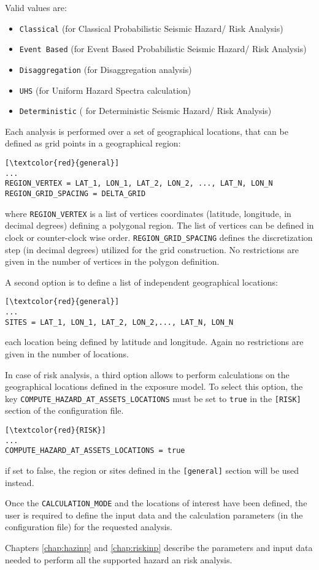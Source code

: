 Valid values are: 
\begin{itemize}
\item \Verb+Classical+ (for Classical Probabilistic Seismic Hazard/ Risk Analysis)
\item \Verb+Event Based+ (for Event Based Probabilistic Seismic Hazard/ Risk Analysis)
\item \Verb+Disaggregation+ (for Disaggregation analysis)
\item \Verb+UHS+ (for Uniform Hazard Spectra calculation)
\item \Verb+Deterministic+ ( for Deterministic Seismic Hazard/ Risk Analysis)
\end{itemize}

Each analysis is performed over a set of geographical locations, that can be defined as grid points in a geographical region:

\begin{Verbatim}[frame=single, commandchars=\\\{\}, samepage=true]
[\textcolor{red}{general}]
...
REGION_VERTEX = LAT_1, LON_1, LAT_2, LON_2, ..., LAT_N, LON_N
REGION_GRID_SPACING = DELTA_GRID
\end{Verbatim}

where \Verb+REGION_VERTEX+ is a list of vertices coordinates (latitude, longitude, in decimal degrees) defining a polygonal region. The list of vertices can be defined in clock or counter-clock wise order. \Verb+REGION_GRID_SPACING+ defines the discretization step (in decimal degrees) utilized for the grid construction. No restrictions are given in the number of vertices in the polygon definition.

A second option is to define a list of independent geographical locations:
\begin{Verbatim}[frame=single, commandchars=\\\{\}, samepage=true]
[\textcolor{red}{general}]
...
SITES = LAT_1, LON_1, LAT_2, LON_2,..., LAT_N, LON_N
\end{Verbatim}
each location being defined by latitude and longitude. Again no restrictions are given in the number of locations.

In case of risk analysis, a third option allows to perform calculations on the geographical locations defined in the exposure model. To select this option, the key \Verb+COMPUTE_HAZARD_AT_ASSETS_LOCATIONS+ must be set to \Verb+true+ in the \Verb+[RISK]+ section of the configuration file.
\begin{Verbatim}[frame=single, commandchars=\\\{\}, samepage=true]
[\textcolor{red}{RISK}]
...
COMPUTE_HAZARD_AT_ASSETS_LOCATIONS = true
\end{Verbatim}
if set to false, the region or sites defined in the \Verb+[general]+ section will be used instead.

Once the \Verb+CALCULATION_MODE+ and the locations of interest have been defined, the user is required to define the input data and the calculation parameters (in the configuration file) for the requested analysis.

Chapters \ref{chap:hazinp} and \ref{chap:riskinp} describe the parameters and input data needed to perform all the supported hazard an risk analysis.